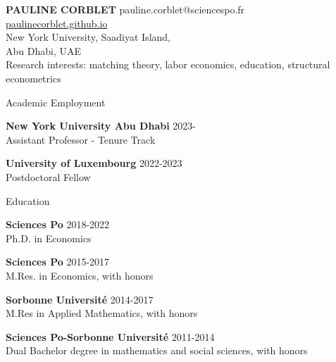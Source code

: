 \documentclass{resume} %
\begin{document}
{\bf \large PAULINE CORBLET} \hfill pauline.corblet@sciencespo.fr\\
{\phantom{smth}} \hfill \href{https://paulinecorblet.github.io}{paulinecorblet.github.io} \\
New York University, Saadiyat Island, \\ 
Abu Dhabi, UAE \\

{\large Research interests: matching theory, labor economics, education, structural econometrics}


\begin{rSection}{Academic Employment}

{\bf New York University Abu Dhabi} \hfill {2023-} \\
  Assistant Professor - Tenure Track

{\bf University of Luxembourg} \hfill {2022-2023} \\
Postdoctoral Fellow

\end{rSection}

\begin{rSection}{Education}

{\bf Sciences Po} \hfill {2018-2022}
\\ Ph.D. in Economics

{\bf Sciences Po} \hfill {2015-2017}
\\ M.Res. in Economics, with honors

{\bf Sorbonne Université} \hfill {2014-2017}
\\ M.Res in Applied Mathematics, with honors

{\bf Sciences Po-Sorbonne Université} \hfill {2011-2014}
\\ Dual Bachelor degree in mathematics and social sciences, with honors


\end{rSection}
%
%
%
\end{document}
